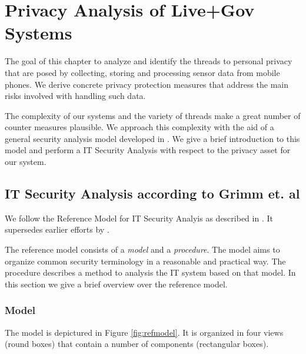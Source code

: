 
\pagebreak

\chapter{Privacy Analysis of Live+Gov Systems}

The goal of this chapter to analyze and identify the threads to personal privacy that are posed by collecting, storing and processing sensor data from mobile phones.
We derive concrete privacy protection measures that address the main risks involved with handling such data.

The complexity of our systems and the variety of threads make a great number of counter measures plausible.
We approach this complexity with the aid of a general security analysis model developed in \cite{Grimm:ItSecRefModel}.
We give a brief introduction to this model and perform a IT Security Analysis with respect to the privacy asset for our system.

\section{IT Security Analysis according to Grimm et. al}\label{sec:GrimmModel}

We follow the Reference Model for IT Security Analyis as described in \cite{Grimm:ItSecRefModel}.
It supersedes earlier efforts by \cite{Avizienis}.

The reference model consists of a \emph{model} and a \emph{procedure}.
The model aims to organize common security terminology in a reasonable and practical way.
The procedure describes a method to analysis the IT system based on that model.
In this section we give a brief overview over the reference model.

\subsection{Model}



The model is depictured in Figure \ref{fig:refmodel}.
It is organized in four views (round boxes) that contain a number of components (rectangular boxes).

